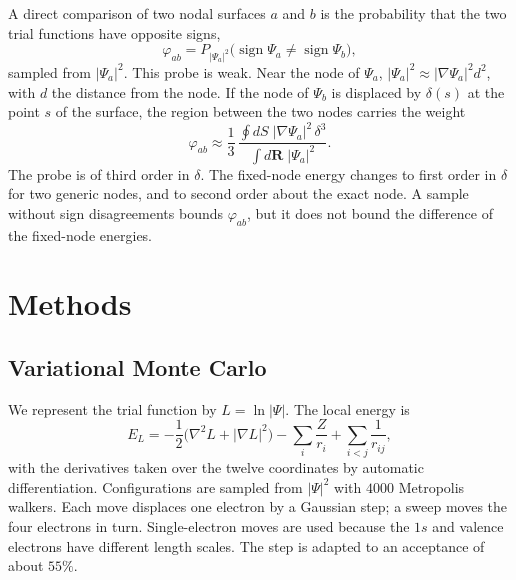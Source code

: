 \documentclass[aps,prb,reprint,amsmath,amssymb,superscriptaddress,nofootinbib]{revtex4-2}
\begin{document}
A direct comparison of two nodal surfaces $a$ and $b$ is the probability that
the two trial functions have opposite signs,
\begin{equation}
    \varphi_{ab} = P_{|\Psi_a|^2}\bigl(\operatorname{sign}\Psi_a
                   \neq \operatorname{sign}\Psi_b\bigr) ,
    \label{eq:phi_ab}
\end{equation}
sampled from $|\Psi_a|^2$. This probe is weak. Near the node of $\Psi_a$,
$|\Psi_a|^2 \approx |\nabla\Psi_a|^2 d^2$, with $d$ the distance from the node.
If the node of $\Psi_b$ is displaced by $\delta(s)$ at the point $s$ of the
surface, the region between the two nodes carries the weight
\begin{equation}
    \varphi_{ab} \approx
    \frac{1}{3}\, \frac{\oint dS\; |\nabla\Psi_a|^2\, \delta^3}
                       {\int d\mathbf{R}\; |\Psi_a|^2} .
    \label{eq:phi_scaling}
\end{equation}
The probe is of third order in $\delta$. The fixed-node energy changes to
first order in $\delta$ for two generic nodes, and to second order about the
exact node. A sample without sign disagreements bounds $\varphi_{ab}$, but it
does not bound the difference of the fixed-node energies.


\section{Methods}
\label{sec:methods}

\subsection{Variational Monte Carlo}
\label{ssec:vmc_method}

We represent the trial function by $L = \ln|\Psi|$. The local energy is
\begin{equation}
    E_L = -\frac{1}{2}\bigl(\nabla^2 L + |\nabla L|^2\bigr)
          - \sum_i \frac{Z}{r_i} + \sum_{i<j} \frac{1}{r_{ij}} ,
    \label{eq:eloc}
\end{equation}
with the derivatives taken over the twelve coordinates by automatic
differentiation. Configurations are sampled from $|\Psi|^2$ with $4000$
Metropolis walkers. Each move displaces one electron by a Gaussian step; a
sweep moves the four electrons in turn. Single-electron moves are used
because the $1s$ and valence electrons have different length scales. The step
is adapted to an acceptance of about $55\%$.
\end{document}
